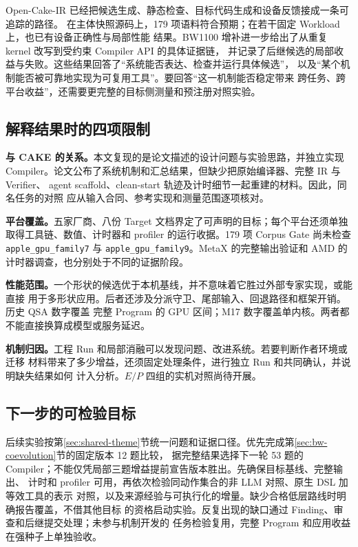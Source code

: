 \documentclass[UTF8,11pt,a4paper,fontset=none]{ctexart}
\newcommand{\code}[1]{\texttt{#1}}
\begin{document}
Open-Cake-IR 已经把候选生成、静态检查、目标代码生成和设备反馈接成一条可追踪的路径。
在主体快照源码上，179 项语料符合预期；在若干固定 Workload 上，也已有设备正确性与局部性能
结果。BW1100 增补进一步给出了从重复 kernel 改写到受约束 Compiler API 的具体证据链，
并记录了后继候选的局部收益与失败。这些结果回答了“系统能否表达、检查并运行具体候选”，
以及“某个机制能否被可靠地实现为可复用工具”。要回答“这一机制能否稳定带来
跨任务、跨平台收益”，还需要更完整的目标侧测量和预注册对照实验。

\subsection{解释结果时的四项限制}
\textbf{与 CAKE 的关系。}本文复现的是论文描述的设计问题与实验思路，并独立实现
Compiler。论文公布了系统机制和汇总结果，但缺少把原始编译器、完整 IR 与 Verifier、
agent scaffold、clean-start 轨迹及计时细节一起重建的材料。因此，同名任务的对照
应从输入合同、参考实现和测量范围逐项核对\cite{papercontract}。

\textbf{平台覆盖。}五家厂商、八份 Target 文档界定了可声明的目标；每个平台还须单独
取得工具链、数值、计时器和 profiler 的运行收据。179 项 Corpus Gate 尚未检查
\code{apple\_gpu\_family7} 与 \code{apple\_gpu\_family9}。MetaX 的完整输出验证和
AMD 的计时器调查，也分别处于不同的证据阶段\cite{status,architecture}。

\textbf{性能范围。}一个形状的候选优于本机基线，并不意味着它胜过外部专家实现，或能直接
用于多形状应用。后者还涉及分派守卫、尾部输入、回退路径和框架开销。历史 QSA 数字覆盖
完整 Program 的 GPU 区间；M17 数字覆盖单内核。两者都不能直接换算成模型或服务延迟。

\textbf{机制归因。}工程 Run 和局部消融可以发现问题、改进系统。若要判断作者环境或迁移
材料带来了多少增益，还须固定处理条件，进行独立 Run 和共同确认，并说明缺失结果如何
计入分析。$E/P$ 四组的实机对照尚待开展。

\subsection{下一步的可检验目标}
后续实验按第\ref{sec:shared-theme}节统一问题和证据口径。优先完成第\ref{sec:bw-coevolution}节的固定版本 12 题比较，
据完整结果选择下一轮 53 题的 Compiler；不能仅凭局部三题增益提前宣告版本胜出。先确保目标基线、完整输出、
计时和 profiler 可用，再依次检验同动作集合的非 LLM 对照、原生 DSL 加等效工具的表示
对照，以及来源经验与可执行化的增量。缺少合格低层路线时明确报告覆盖，不借其他目标
的资格启动实验。反复出现的缺口通过 Finding、审查和后继提交处理；未参与机制开发的
任务检验复用，完整 Program 和应用收益在强种子上单独验收。
\end{document}
